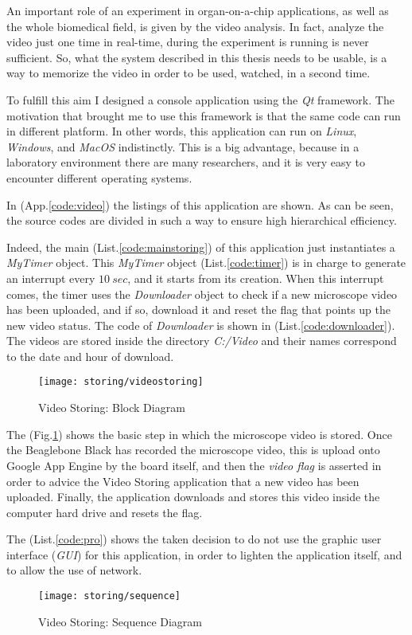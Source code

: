 An important role of an experiment in organ-on-a-chip applications, as well as the whole biomedical field, is given by the video analysis. In fact, analyze the video just one time in real-time, during the experiment is running is never sufficient. So, what the system described in this thesis needs to be usable, is a way to memorize the video in order to be used, watched, in a second time.

To fulfill this aim I designed a console application using the \textit{Qt} framework. The motivation that brought me to use this framework is that the same code can run in different platform. In other words, this application can run on \textit{Linux}, \textit{Windows}, and \textit{MacOS}  indistinctly. This is a big advantage, because in a laboratory environment there are many researchers, and it is very easy to encounter different operating systems.

 In (App.\ref{code:video}) the listings of this application are shown. As can be seen, the source codes are divided in such a way to ensure high hierarchical efficiency.
 
 Indeed, the main (List.\ref{code:mainstoring}) of this application just instantiates a \textit{MyTimer} object. This \textit{MyTimer} object (List.\ref{code:timer}) is in charge to generate an interrupt every $10\ sec$, and it starts from its creation. When this interrupt comes, the timer uses the \textit{Downloader} object to check if  a new microscope video has been uploaded, and if so, download it and reset the flag that points up the new video status. The code of \textit{Downloader} is shown in (List.\ref{code:downloader}). The videos are stored inside the directory \textit{C:/Video} and their names correspond to the date and hour of download. 
 
 \begin{figure}[h]
 	\centering
 	\texttt{[image: storing/videostoring]}
 	\caption{Video Storing: Block Diagram}
 	\label{Fig:videostoring}
 	
 \end{figure}
 
 The (Fig.\ref{Fig:videostoring}) shows the basic step in which the microscope video is stored. Once the Beaglebone Black has recorded the microscope video, this is upload onto Google App Engine by the board itself, and then the \textit{video flag} is asserted in order to advice the Video Storing application that a new video has been uploaded. Finally, the application downloads and stores this video inside the computer hard drive and resets the flag.
 
 The (List.\ref{code:pro}) shows the taken decision to do not use the graphic user interface (\textit{GUI}) for this application, in order to lighten the application itself, and to allow the use of network.
 
  \begin{figure}[h]
  	\centering
  	\texttt{[image: storing/sequence]}
  	\caption{Video Storing: Sequence Diagram}
  	\label{Fig:sequenceStoring}
  	
  \end{figure}
